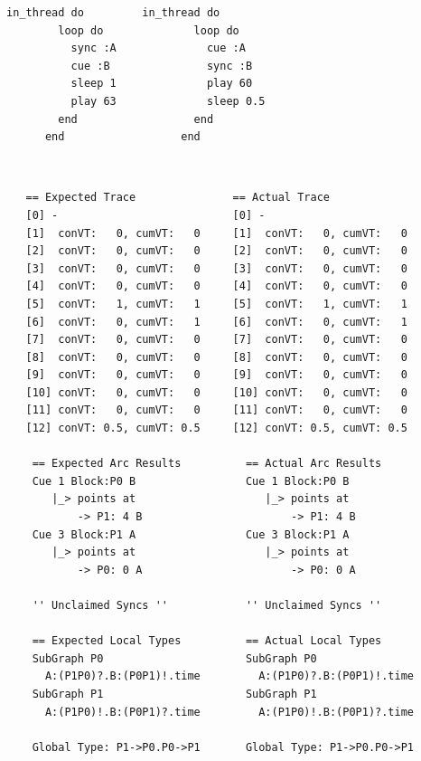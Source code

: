\documentclass[11pt, abstracton, twoside, titlepage=true]{scrartcl}
\begin{document}
\begin{minipage}{\textwidth}
	\begin{lstlisting}[style = sonicpi]
      in_thread do         in_thread do
        loop do              loop do
          sync :A              cue :A 
          cue :B               sync :B
          sleep 1              play 60
          play 63              sleep 0.5
        end                  end
      end                  end
	\end{lstlisting}
\end{minipage}
\\
\begin{lstlisting}
   == Expected Trace               == Actual Trace
   [0] -                           [0] -
   [1]  conVT:   0, cumVT:   0     [1]  conVT:   0, cumVT:   0
   [2]  conVT:   0, cumVT:   0     [2]  conVT:   0, cumVT:   0
   [3]  conVT:   0, cumVT:   0     [3]  conVT:   0, cumVT:   0
   [4]  conVT:   0, cumVT:   0     [4]  conVT:   0, cumVT:   0
   [5]  conVT:   1, cumVT:   1     [5]  conVT:   1, cumVT:   1
   [6]  conVT:   0, cumVT:   1     [6]  conVT:   0, cumVT:   1
   [7]  conVT:   0, cumVT:   0     [7]  conVT:   0, cumVT:   0
   [8]  conVT:   0, cumVT:   0     [8]  conVT:   0, cumVT:   0
   [9]  conVT:   0, cumVT:   0     [9]  conVT:   0, cumVT:   0
   [10] conVT:   0, cumVT:   0     [10] conVT:   0, cumVT:   0
   [11] conVT:   0, cumVT:   0     [11] conVT:   0, cumVT:   0
   [12] conVT: 0.5, cumVT: 0.5     [12] conVT: 0.5, cumVT: 0.5

    == Expected Arc Results          == Actual Arc Results 
    Cue 1 Block:P0 B                 Cue 1 Block:P0 B
       |_> points at                    |_> points at 
           -> P1: 4 B                       -> P1: 4 B
    Cue 3 Block:P1 A                 Cue 3 Block:P1 A
       |_> points at                    |_> points at 
           -> P0: 0 A                       -> P0: 0 A

    '' Unclaimed Syncs ''            '' Unclaimed Syncs '' 

    == Expected Local Types          == Actual Local Types
    SubGraph P0                      SubGraph P0
      A:(P1P0)?.B:(P0P1)!.time         A:(P1P0)?.B:(P0P1)!.time
    SubGraph P1                      SubGraph P1
      A:(P1P0)!.B:(P0P1)?.time         A:(P1P0)!.B:(P0P1)?.time

    Global Type: P1->P0.P0->P1       Global Type: P1->P0.P0->P1
\end{lstlisting}
\end{document}
